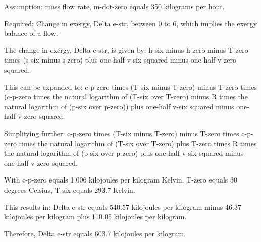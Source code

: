 Assumption: mass flow rate, m-dot-zero equals 350 kilograms per hour.

Required: Change in exergy, Delta e-str, between 0 to 6, which implies the exergy balance of a flow.

The change in exergy, Delta e-str, is given by:
h-six minus h-zero minus T-zero times (s-six minus s-zero) plus one-half v-six squared minus one-half v-zero squared.

This can be expanded to:
c-p-zero times (T-six minus T-zero) minus T-zero times (c-p-zero times the natural logarithm of (T-six over T-zero) minus R times the natural logarithm of (p-six over p-zero)) plus one-half v-six squared minus one-half v-zero squared.

Simplifying further:
c-p-zero times (T-six minus T-zero) minus T-zero times c-p-zero times the natural logarithm of (T-six over T-zero) plus T-zero times R times the natural logarithm of (p-six over p-zero) plus one-half v-six squared minus one-half v-zero squared.

With c-p-zero equals 1.006 kilojoules per kilogram Kelvin, T-zero equals 30 degrees Celsius, T-six equals 293.7 Kelvin.

This results in:
Delta e-str equals 540.57 kilojoules per kilogram minus 46.37 kilojoules per kilogram plus 110.05 kilojoules per kilogram.

Therefore, Delta e-str equals 603.7 kilojoules per kilogram.
